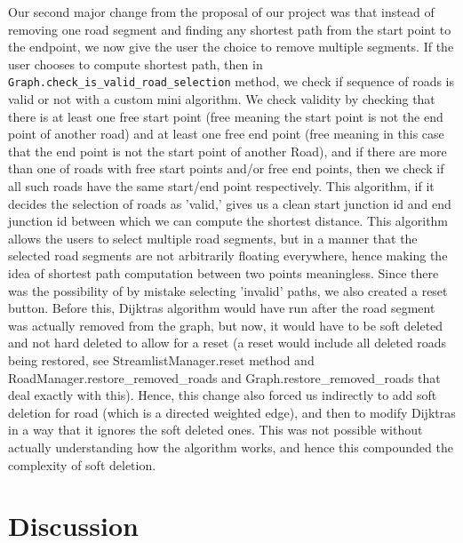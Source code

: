 \documentclass[fontsize=11pt]{article}
\begin{document}
Our second major change from the proposal of our project was that instead of removing one road segment and finding any shortest path from the start point to the endpoint, we now give the user the choice to remove multiple segments. If the user chooses to compute shortest path, then in \texttt{Graph.check\_is\_valid\_road\_selection} method, we check if sequence of roads is valid or not with a custom mini algorithm. We check validity by checking that there is at least one free start point (free meaning the start point is not the end point of another road) and at least one free end point (free meaning in this case that the end point is not the start point of another Road), and if there are more than one of roads with free start points and/or free end points, then we check if all such roads have the same start/end point respectively. This algorithm, if it decides the selection of roads as 'valid,' gives us a clean start junction id and end junction id between which we can compute the shortest distance. This algorithm allows the users to select multiple road segments, but in a manner that the selected road segments are not arbitrarily floating everywhere, hence making the idea of shortest path computation between two points meaningless. Since there was the possibility of by mistake selecting 'invalid' paths, we also created a reset button. Before this, Dijktras algorithm would have run after the road segment was actually removed from the graph, but now, it would have to be soft deleted and not hard deleted to allow for a reset (a reset would include all deleted roads being restored, see StreamlistManager.reset method and RoadManager.restore\_removed\_roads and Graph.restore\_removed\_roads that deal exactly with this). Hence, this change also forced us indirectly to add soft deletion for road (which is a directed weighted edge), and then to modify Dijktras in a way that it ignores the soft deleted ones. This was not possible without actually understanding how the algorithm works, and hence this compounded the complexity of soft deletion.

\section{Discussion}
\end{document}
